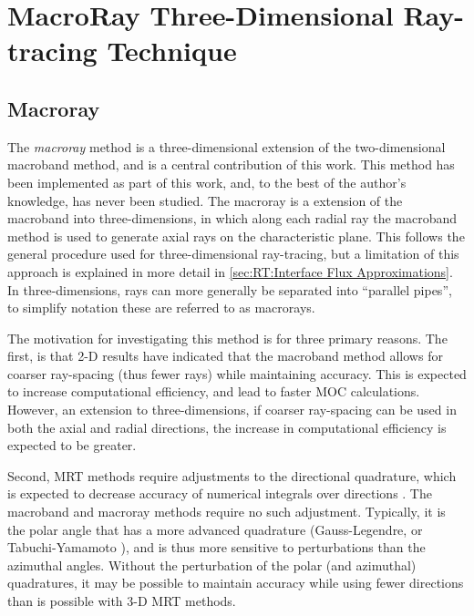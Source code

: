 \chapter{MacroRay Three-Dimensional Ray-tracing Technique}{\label{ch:MacroRay Three-Dimensional Ray-tracing Technique}
  
  
  
  \def\figpath{chapters/MacroRay/figures/}
  \graphicspath{ {\figpath} }

  \section{Macroray}{\label{sec:RT:Macroray}
    The \emph{macroray} method is a three-dimensional extension of the two-dimensional macroband method, and is a central contribution of this work.
    This method has been implemented as part of this work, and, to the best of the author's knowledge, has never been studied.
    The macroray is a extension of the macroband into three-dimensions, in which along each radial ray the macroband method is used to generate axial rays on the characteristic plane.
    This follows the general procedure used for three-dimensional ray-tracing, but a limitation of this approach is explained in more detail in \cref{sec:RT:Interface Flux Approximations}.
    In three-dimensions, rays can more generally be separated into ``parallel pipes'', to simplify notation these are referred to as macrorays.

    The motivation for investigating this method is for three primary reasons.
    The first, is that 2-D results \cite{Yamamoto2005,Fevotte2007,Yamamoto2008} have indicated that the macroband method allows for coarser ray-spacing (thus fewer rays) while maintaining accuracy.
    This is expected to increase computational efficiency, and lead to faster \ac{MOC} calculations.
    However, an extension to three-dimensions, if coarser ray-spacing can be used in both the axial and radial directions, the increase in computational efficiency is expected to be greater.

    Second, \ac{MRT} methods require adjustments to the directional quadrature, which is expected to decrease accuracy of numerical integrals over directions \cite{Kochunas2013}.
    The macroband and macroray methods require no such adjustment.
    Typically, it is the polar angle that has a more advanced quadrature (Gauss-Legendre, or Tabuchi-Yamamoto \cite{TabuchiYamamotoQuad}), and is thus more sensitive to perturbations than the azimuthal angles.
    Without the perturbation of the polar (and azimuthal) quadratures, it may be possible to maintain accuracy while using fewer directions than is possible with 3-D \ac{MRT} methods.

}}
